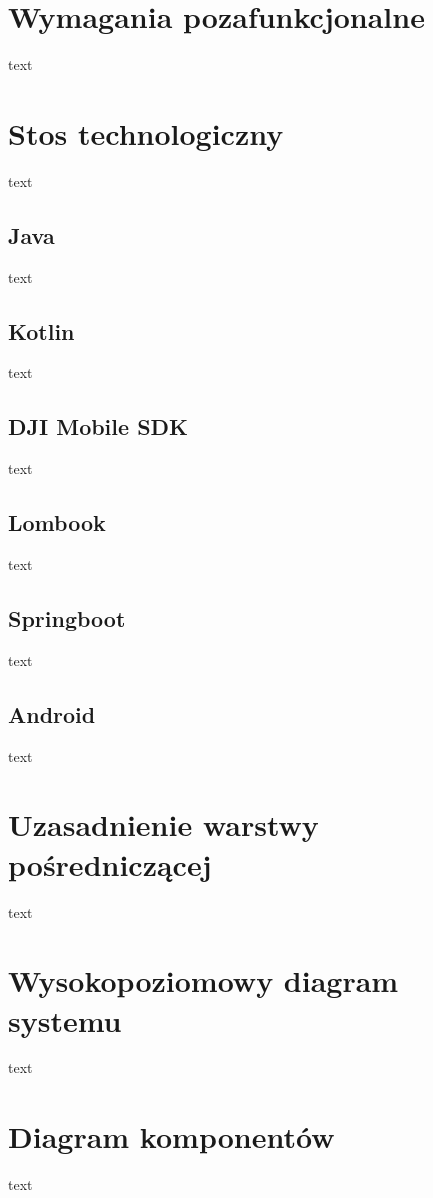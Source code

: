 \documentclass[12pt, a4paper, twoside]{report}
\begin{document}
\section{Wymagania pozafunkcjonalne}
\hspace{1cm}text
\section{Stos technologiczny}
\hspace{1cm}text
\subsection{Java}
\hspace{1cm}text
\subsection{Kotlin}
\hspace{1cm}text
\subsection{DJI Mobile SDK}
\hspace{1cm}text
\subsection{Lombook}
\hspace{1cm}text
\subsection{Springboot}
\hspace{1cm}text
\subsection{Android}
\hspace{1cm}text
\section{Uzasadnienie warstwy pośredniczącej}
\hspace{1cm}text
\section{Wysokopoziomowy diagram systemu}
\hspace{1cm}text
\section{Diagram komponentów}
\hspace{1cm}text
\end{document}
